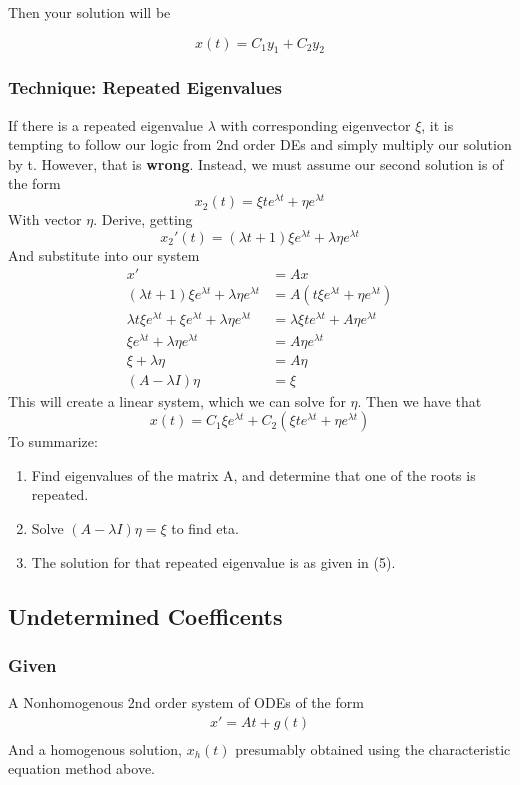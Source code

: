 \documentclass[11pt]{article}
\begin{document}
Then your solution will be

\[ x(t) = C_1y_1 + C_2y_2 \]

\subsubsection{Technique: Repeated Eigenvalues}
If there is a repeated eigenvalue $\lambda$ with corresponding eigenvector $\xi$, it is tempting to 
follow our logic from 2nd order DEs and simply multiply our solution by t. However, that is \textbf{wrong}.
Instead, we must assume our second solution is of the form 
\[ x_2(t) = \xi te^{\lambda t} + \eta e^{\lambda t} \]
With vector $\eta$. Derive, getting
\[ x_2'(t) = (\lambda t + 1)\xi e^{\lambda t} + \lambda \eta e^{\lambda t} \]
And substitute into our system
\begin{align*}
    x' &= Ax \\ 
    (\lambda t + 1)\xi e^{\lambda t} + \lambda \eta e^{\lambda t} &= A(t\xi e^{\lambda t} + \eta e^{\lambda t})  \\
    \lambda t \xi e^{\lambda t} + \xi e^{\lambda t} + \lambda \eta e^{\lambda t} &= \lambda \xi t e^{\lambda t} + A\eta e^{\lambda t} \\
     \xi e^{\lambda t} + \lambda \eta e^{\lambda t} &= A\eta e^{\lambda t} \\
     \xi  + \lambda \eta &= A\eta  \\
    (A - \lambda I)\eta &= \xi
\end{align*}
This will create a linear system, which we can solve for $\eta$. Then we have that
\begin{equation}
x(t) = C_1\xi e^{\lambda t} + C_2(\xi te^{\lambda t} + \eta e^{\lambda t}) 
\end{equation}
To summarize:
\begin{enumerate}
    \item Find eigenvalues of the matrix A, and determine that one of the roots is repeated.
    \item Solve $(A - \lambda I)\eta = \xi$ to find eta.
    \item The solution for that repeated eigenvalue is as given in (5).
\end{enumerate}
\subsection{Undetermined Coefficents}
\subsubsection{Given}
A Nonhomogenous 2nd order system of ODEs of the form
\begin{align*}
    x' = At + g(t) \\
\end{align*}
And a homogenous solution, $x_h(t)$ presumably obtained using the characteristic equation method above.
\end{document}
